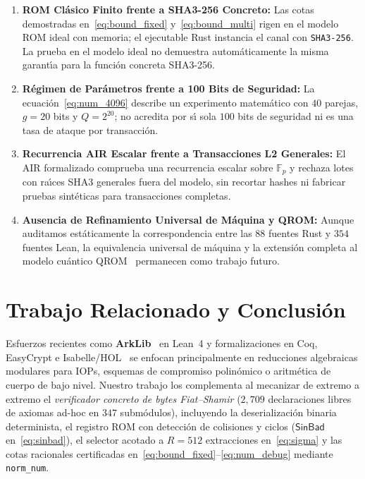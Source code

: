 \documentclass[conference]{IEEEtran}
\theoremstyle{definition}
\begin{document}
\begin{enumerate}
    \setlength{\itemsep}{2pt}
    \item \textbf{ROM Cl\'{a}sico Finito frente a SHA3-256 Concreto:} Las cotas demostradas en~\eqref{eq:bound_fixed} y~\eqref{eq:bound_multi} rigen en el modelo ROM ideal con memoria; el ejecutable Rust instancia el canal con \texttt{SHA3-256}. La prueba en el modelo ideal no demuestra autom\'{a}ticamente la misma garant\'{\i}a para la funci\'{o}n concreta SHA3-256.
    \item \textbf{R\'{e}gimen de Par\'{a}metros frente a 100 Bits de Seguridad:} La ecuaci\'{o}n~\eqref{eq:num_4096} describe un experimento matem\'{a}tico con $40$ parejas, $g = 20$ bits y $Q = 2^{20}$; no acredita por s\'{\i} sola $100$ bits de seguridad ni es una tasa de ataque por transacci\'{o}n.
    \item \textbf{Recurrencia AIR Escalar frente a Transacciones L2 Generales:} El AIR formalizado comprueba una recurrencia escalar sobre $\mathbb{F}_p$ y rechaza lotes con ra\'{\i}ces SHA3 generales fuera del modelo, sin recortar hashes ni fabricar pruebas sint\'{e}ticas para transacciones completas.
    \item \textbf{Ausencia de Refinamiento Universal de M\'{a}quina y QROM:} Aunque auditamos est\'{a}ticamente la correspondencia entre las $88$ fuentes Rust y $354$ fuentes Lean, la equivalencia universal de m\'{a}quina y la extensi\'{o}n completa al modelo cu\'{a}ntico QROM~\cite{zhandry2019record,chiesa2020post} permanecen como trabajo futuro.
\end{enumerate}

\section{Trabajo Relacionado y Conclusi\'{o}n}
\label{sec:conclusion}

Esfuerzos recientes como \textbf{ArkLib}~\cite{arklib2024} en Lean~4 y formalizaciones en Coq, EasyCrypt e Isabelle/HOL~\cite{barthe2011certicrypt,lochbihler2019crypthol,erbsen2019simple,zinzindohoue2017hacl,almeida2017jasmin,goldberg2021cairo} se enfocan principalmente en reducciones algebraicas modulares para IOPs, esquemas de compromiso polin\'{o}mico o aritm\'{e}tica de cuerpo de bajo nivel. Nuestro trabajo los complementa al mecanizar de extremo a extremo el \emph{verificador concreto de bytes Fiat--Shamir} ($2{,}709$ declaraciones libres de axiomas ad-hoc en $347$ subm\'{o}dulos), incluyendo la deserializaci\'{o}n binaria determinista, el registro ROM con detecci\'{o}n de colisiones y ciclos ($\mathsf{SinBad}$ en~\eqref{eq:sinbad}), el selector acotado a $R = 512$ extracciones en~\eqref{eq:sigma} y las cotas racionales certificadas en~\eqref{eq:bound_fixed}--\eqref{eq:num_debug} mediante \texttt{norm\_num}.
\end{document}
